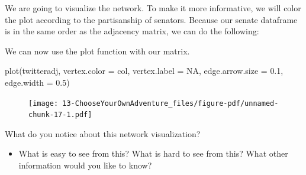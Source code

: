 \documentclass[
  letterpaper,
  DIV=11,
  numbers=noendperiod]{scrreprt}
\newenvironment{Shaded}{\begin{snugshade}}{\end{snugshade}}
\newcommand{\AttributeTok}[1]{\textcolor[rgb]{0.40,0.45,0.13}{#1}}
\newcommand{\ConstantTok}[1]{\textcolor[rgb]{0.56,0.35,0.01}{#1}}
\newcommand{\DecValTok}[1]{\textcolor[rgb]{0.68,0.00,0.00}{#1}}
\newcommand{\FloatTok}[1]{\textcolor[rgb]{0.68,0.00,0.00}{#1}}
\newcommand{\FunctionTok}[1]{\textcolor[rgb]{0.28,0.35,0.67}{#1}}
\newcommand{\NormalTok}[1]{\textcolor[rgb]{0.00,0.23,0.31}{#1}}
\newcommand{\OtherTok}[1]{\textcolor[rgb]{0.00,0.23,0.31}{#1}}
\newcommand{\SpecialCharTok}[1]{\textcolor[rgb]{0.37,0.37,0.37}{#1}}
\newcommand{\StringTok}[1]{\textcolor[rgb]{0.13,0.47,0.30}{#1}}
\providecommand{\tightlist}{%
  \setlength{\itemsep}{0pt}\setlength{\parskip}{0pt}}\usepackage{longtable,booktabs,array}
\begin{document}
We are going to visualize the network. To make it more informative, we
will color the plot according to the partisanship of senators. Because
our senate dataframe is in the same order as the adjacency matrix, we
can do the following:

\begin{Shaded}
\end{Shaded}

We can now use the plot function with our matrix.

\begin{Shaded}
\begin{Highlighting}[]
\FunctionTok{plot}\NormalTok{(twitteradj, }
     \AttributeTok{vertex.color =}\NormalTok{ col, }
     \AttributeTok{vertex.label =} \ConstantTok{NA}\NormalTok{, }
     \AttributeTok{edge.arrow.size =} \FloatTok{0.1}\NormalTok{, }
     \AttributeTok{edge.width =} \FloatTok{0.5}\NormalTok{)}
\end{Highlighting}
\end{Shaded}

\begin{figure}[H]

{\centering \texttt{[image: 13-ChooseYourOwnAdventure\_files/figure-pdf/unnamed-chunk-17-1.pdf]}

}

\end{figure}

What do you notice about this network visualization?

\begin{itemize}
\tightlist
\item
  What is easy to see from this? What is hard to see from this? What
  other information would you like to know?
\end{itemize}
\end{document}
